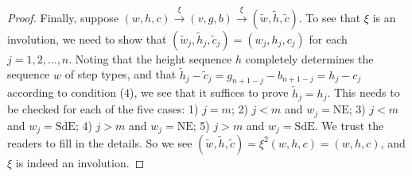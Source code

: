 \documentclass[12pt]{amsart}
\numberwithin{equation}{section}
\theoremstyle{plain}
\theoremstyle{definition}
\def\NE{\mathrm{NE}}
\def\SdE{\mathrm{SdE}}
\begin{document}
\begin{proof}
Finally, suppose $(w,h,c)\stackrel{\xi}{\rightarrow}(v,g,b)\stackrel{\xi}{\rightarrow}(\tilde{w},\tilde{h},\tilde{c})$. To see that $\xi$ is an involution, we need to show that $(\tilde{w}_j,\tilde{h}_j,\tilde{c}_j)=(w_j,h_j,c_j)$ for each $j=1,2,\ldots,n$. Noting that the height sequence $h$ completely determines the sequence $w$ of step types, and that $\tilde{h}_j-\tilde{c}_j=g_{n+1-j}-b_{n+1-j}=h_j-c_j$ according to condition (4), we see that it suffices to prove $\tilde{h}_j=h_j$. This needs to be checked for each of the five cases: 1) $j=m$; 2) $j<m$ and $w_j=\NE$; 3) $j<m$ and $w_j=\SdE$; 4) $j>m$ and $w_j=\NE$; 5) $j>m$ and $w_j=\SdE$. We trust the readers to fill in the details. So we see $(\tilde{w},\tilde{h},\tilde{c})=\xi^2(w,h,c)=(w,h,c)$, and $\xi$ is indeed an involution.
\end{proof}
\end{document}
